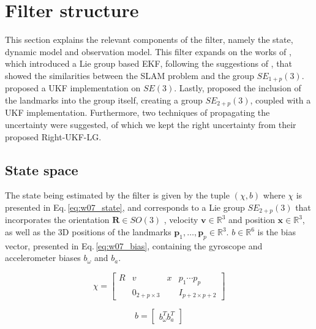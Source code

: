 \documentclass[10pt,twocolumn]{IEEEtran}
\begin{document}
\section{Filter structure}

This section explains the relevant components of the filter, namely the state, dynamic model and observation model. This filter expands on the works of \cite{barrau2015ekf}, which introduced a Lie group based EKF, following the suggestions of \cite{bonnabel2012symmetries}, that showed the similarities between the SLAM problem and the group $SE_{1+p}(3)$. \cite{loianno2016visual} proposed a UKF implementation on  $SE(3)$. Lastly, \cite{brossard2017unscented} proposed the inclusion of the landmarks into the group itself, creating a group $SE_{2+p}(3)$, coupled with a UKF implementation. Furthermore, two techniques of propagating the uncertainty were suggested, of which we kept the right uncertainty from their proposed Right-UKF-LG.

\subsection{State space}

The state being estimated by the filter is given by the tuple $\left( \chi, b\right)$ where $\chi$ is presented in Eq.$\,$\ref{eq:w07_state}, and corresponds to a Lie group $SE_{2+p}(3)$ that incorporates the orientation $\mathbf{R} \in SO(3)$ , velocity $\mathbf{v} \in \mathbb{R}^3$  and position $\mathbf{x} \in \mathbb{R}^3$, as well as the 3D positions of the landmarks $\mathbf{p}_1,\ldots,\mathbf{p}_p \in \mathbb{R}^3$. $b \in \mathbb{R}^6$ is the bias vector, presented in Eq.\,\eqref{eq:w07_bias}, containing the gyroscope and accelerometer biases $b_\omega$ and $b_a$. 


\begin{equation}
    \label{eq:w07_state}
    \chi = \begin{bmatrix}
        R & v & x & p_1 \cdots p_p \\ 
         &0_{2+p\times 3}   &&I_{p+2\times p+2}
        \end{bmatrix}
\end{equation}

\begin{equation}
    \label{eq:w07_bias}
    b= \begin{bmatrix}
        b_\omega ^T b_a^T
    \end{bmatrix}
\end{equation}
\end{document}
